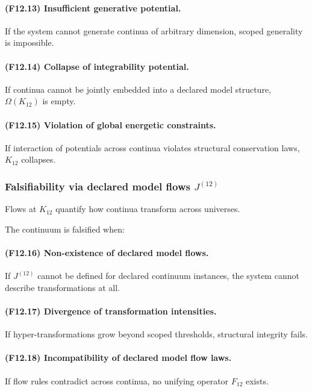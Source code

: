 \paragraph{(F12.13) Insufficient generative potential.}
If the system cannot generate continua of arbitrary dimension,
scoped generality is impossible.

\paragraph{(F12.14) Collapse of integrability potential.}
If continua cannot be jointly embedded into a declared model structure,
$\Omega(K_{12})$ is empty.

\paragraph{(F12.15) Violation of global energetic constraints.}
If interaction of potentials across continua violates structural
conservation laws, $K_{12}$ collapses.



\subsubsection{Falsifiability via declared model flows $J^{(12)}$}

Flows at $K_{12}$ quantify how continua transform across universes.

The continuum is falsified when:

\paragraph{(F12.16) Non-existence of declared model flows.}
If $J^{(12)}$ cannot be defined for declared continuum instances,
the system cannot describe transformations at all.

\paragraph{(F12.17) Divergence of transformation intensities.}
If hyper-transformations grow beyond scoped thresholds,
structural integrity fails.

\paragraph{(F12.18) Incompatibility of declared model flow laws.}
If flow rules contradict across continua,
no unifying operator $F_{12}$ exists.

